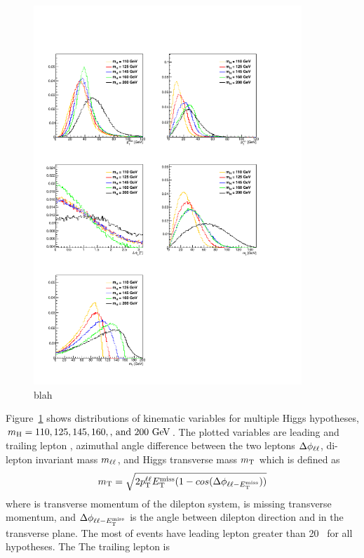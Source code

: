 \begin{figure}[htp]
\centering
\includegraphics[width=0.9\textwidth]{figures/hww_gen_all.pdf}
\caption{ blah }
\label{fig:genhww}
\end{figure}
Figure~\ref{fig:genhww} shows distributions of kinematic variables for 
multiple Higgs hypotheses, $m_{\mathrm{H}} = 110, 125, 145, 160,\textrm{, and } 200~\mathrm{Ge\kern -0.1em V}$. 
The plotted variables are leading and trailing lepton \pt, 
azimuthal angle difference between the two leptons $\Delta\phi_{\ell\ell}$, 
di-lepton invariant mass $m_{\ell\ell}$, and Higgs transverse mass $m_{\mathrm{T}}$ which is 
defined as 
\begin{eqnarray} 
m_{\mathrm{T}} = \sqrt{2p_\mathrm{T}^{\ell\ell}E_\mathrm{T}^{\mathrm{miss}}(1-cos(\Delta\phi_{\ell\ell-E_\mathrm{T}^{\mathrm{miss}}}))}
\end{eqnarray} 
where \pt{} is transverse momentum of the dilepton system, 
\met{} is missing transverse momentum, and  
$\Delta\phi_{\ell\ell-E_\mathrm{T}^{\mathrm{miss}}}$ is the angle between dilepton
direction and \met{} in the transverse plane.
The most of events have leading lepton \ptlmax{} greater than 20~\GeV{} 
for all \mHi{} hypotheses. The The trailing lepton \ptlmin{} is 
